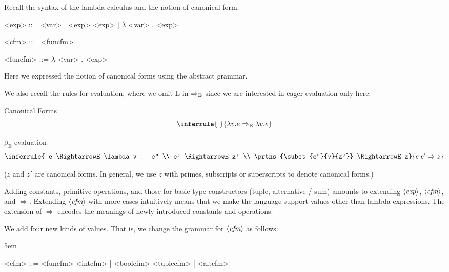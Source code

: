 \begin{enumcirc}
	\item
	Recall the syntax of the lambda calculus and the notion of canonical form.
	\begin{center}
		\begin{minipage}{0.5\textwidth}
			\begin{grammar}
				<exp> ::= <var>
				| <exp> <exp>
				| $\lambda$ <var> . <exp>

				<cfm> ::= <funcfm>

				<funcfm> ::= $\lambda$ <var> . <exp>
			\end{grammar}
		\end{minipage}
	\end{center}
	Here we expressed the notion of canonical forms using the abstract grammar.

	We also recall the rules for evaluation; where we omit $\textrm{E}$ in
	$\RightarrowE$ since we are interested in eager evaluation only here.

	Canonical Forms
	\[
		\inferrule{\;}{\lambda v. e \RightarrowE \lambda v. e}
	\]

	$\beta_\textrm{E}$-evaluation
	\[
		\inferrule
		{
			e \RightarrowE \lambda v . e'' \\
			e' \RightarrowE z' \\
			\prths{\subst{e''}{v}{z'}} \RightarrowE z}
		{e \; e' \Rightarrow z}
	\]

	($z$ and $z'$ are canonical forms.
	In general, we use $z$ with primes, subscripts or superscripts to denote
	canonical forms.)
	\item
	Adding constants, primitive operations, and those for basic type constructors
	(tuple, alternative / sum) amounts to extending $\gram{exp}$, $\gram{cfm}$, and
	$\Rightarrow$.
	Extending $\gram{cfm}$ with more cases intuitively means that we make the
	language support values other than lambda expressions.
	The extension of $\Rightarrow$ encodes the meanings of newly introduced
	constants and operations.
	\item
	We add four new kinds of values.
	That is, we change the grammar for $\gram{cfm}$ as follows:
	\begin{center}
		\begin{minipage}{0.4\textwidth}
			\grammarindent5em
			\begin{grammar}
				<cfm> ::= <funcfm>
				\alt <intcfm> \;|\; <boolcfm>
				\alt <tuplecfm> \;|


\end{grammar}
\end{minipage}
\end{center}
\end{enumcirc}
